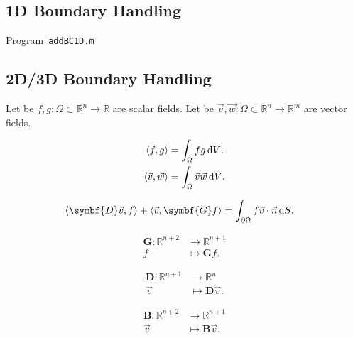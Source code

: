 \subsection{1D Boundary Handling}

\begin{listing}[ht!]
	\tiny
	\centering
	\caption{Program~\texttt{addBC1D.m}}
	\label{code:addBC1D.m}
\end{listing}

\subsection{2D/3D Boundary Handling}

Let be
\begin{math}
	f,g\colon\Omega\subset\mathbb{R}^{n}\to
	\mathbb{R}
\end{math}
are scalar fields.
Let be
\begin{math}
	\vec{v},\vec{w}\colon\Omega\subset\mathbb{R}^{n}\to
	\mathbb{R}^{m}
\end{math}
are vector fields.

\begin{align*}
	\left\langle
	f,g
	\right\rangle & =
	\int_{\Omega}fg \dl V. \\
	\left\langle
	\vec{v},\vec{w}
	\right\rangle & =
	\int_{\Omega}\vec{v}\vec{w}\dl V.
\end{align*}

\begin{align*}
	\left\langle
	\symbf{D}\vec{v},
	f
	\right\rangle+
	\left\langle
	\vec{v},
	\symbf{G}f
	\right\rangle & =
	\int_{\partial\Omega}
	f\vec{v}\cdot\vec{n}\dl S.
\end{align*}

\begin{align*}
	\symbf{G}\colon\mathbb{R}^{n+2} & \longrightarrow
	\mathbb{R}^{n+1}                                  \\
	f                               & \longmapsto
	\symbf{G}f.
\end{align*}

\begin{align*}
	\symbf{D}\colon\mathbb{R}^{n+1} & \longrightarrow
	\mathbb{R}^{n}                                    \\
	\vec{v}                         & \longmapsto
	\symbf{D}\vec{v}.
\end{align*}

\begin{align*}
	\symbf{B}\colon\mathbb{R}^{n+2} & \longrightarrow
	\mathbb{R}^{n+1}                                  \\
	\vec{v}                         & \longmapsto
	\symbf{B}\vec{v}.
\end{align*}

